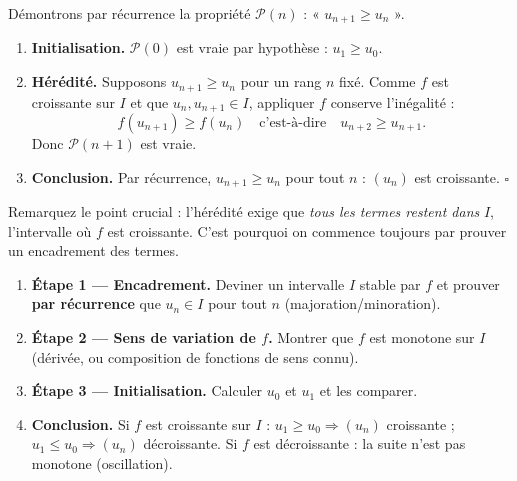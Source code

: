 \documentclass[11pt]{article}
\begin{document}
\begin{experience}
Démontrons par récurrence la propriété $\mathcal{P}(n)$ : « $u_{n+1} \geq u_n$ ».
\begin{enumerate}
\item \textbf{Initialisation.} $\mathcal{P}(0)$ est vraie par hypothèse : $u_1 \geq u_0$.
\item \textbf{Hérédité.} Supposons $u_{n+1} \geq u_n$ pour un rang $n$ fixé. Comme $f$ est croissante sur $I$ et que $u_n, u_{n+1} \in I$, appliquer $f$ conserve l'inégalité :
\[ f(u_{n+1}) \geq f(u_n) \quad \text{c'est-à-dire} \quad u_{n+2} \geq u_{n+1}. \]
Donc $\mathcal{P}(n+1)$ est vraie.
\item \textbf{Conclusion.} Par récurrence, $u_{n+1} \geq u_n$ pour tout $n$ : $(u_n)$ est croissante. $\square$
\end{enumerate}
Remarquez le point crucial : l'hérédité exige que \emph{tous les termes restent dans} $I$, l'intervalle où $f$ est croissante. C'est pourquoi on commence toujours par prouver un encadrement des termes.
\end{experience}

\begin{methode}[Étudier la monotonie d'une suite récurrente $u_{n+1} = f(u_n)$]
\begin{enumerate}
\item \textbf{Étape 1 — Encadrement.} Deviner un intervalle $I$ stable par $f$ et prouver \textbf{par récurrence} que $u_n \in I$ pour tout $n$ (majoration/minoration).
\item \textbf{Étape 2 — Sens de variation de $f$.} Montrer que $f$ est monotone sur $I$ (dérivée, ou composition de fonctions de sens connu).
\item \textbf{Étape 3 — Initialisation.} Calculer $u_0$ et $u_1$ et les comparer.
\item \textbf{Conclusion.} Si $f$ est croissante sur $I$ : $u_1 \geq u_0 \Rightarrow (u_n)$ croissante ; $u_1 \leq u_0 \Rightarrow (u_n)$ décroissante. Si $f$ est décroissante : la suite n'est pas monotone (oscillation).
\end{enumerate}
\end{methode}
\end{document}
